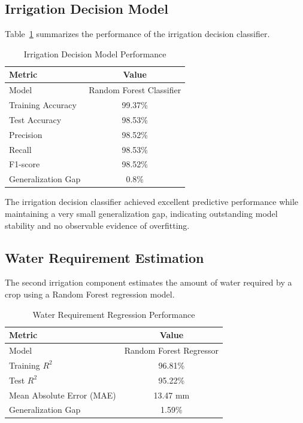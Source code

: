 \subsection{Irrigation Decision Model}

Table~\ref{tab:irrigation_decision} summarizes the performance of the irrigation decision classifier.

\begin{table}[H]
\centering
\caption{Irrigation Decision Model Performance}
\label{tab:irrigation_decision}
\renewcommand{\arraystretch}{1.4}
\begin{tabular}{lc}
\toprule
\textbf{Metric} & \textbf{Value} \\
\midrule
Model & Random Forest Classifier \\
Training Accuracy & 99.37\% \\
Test Accuracy & 98.53\% \\
Precision & 98.52\% \\
Recall & 98.53\% \\
F1-score & 98.52\% \\
Generalization Gap & 0.8\% \\
\bottomrule
\end{tabular}
\end{table}

The irrigation decision classifier achieved excellent predictive performance while maintaining a very small generalization gap, indicating outstanding model stability and no observable evidence of overfitting.

\subsection{Water Requirement Estimation}

The second irrigation component estimates the amount of water required by a crop using a Random Forest regression model.

\begin{table}[H]
\centering
\caption{Water Requirement Regression Performance}
\label{tab:water_requirement}
\renewcommand{\arraystretch}{1.4}
\begin{tabular}{lc}
\toprule
\textbf{Metric} & \textbf{Value} \\
\midrule
Model & Random Forest Regressor \\
Training $R^2$ & 96.81\% \\
Test $R^2$ & 95.22\% \\
Mean Absolute Error (MAE) & 13.47 mm \\
Generalization Gap & 1.59\% \\
\bottomrule
\end{tabular}
\end{table}

